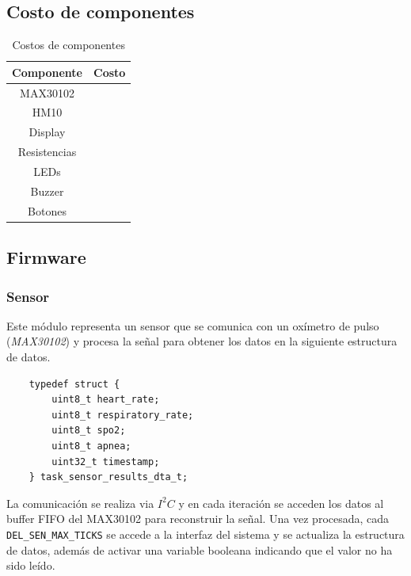 \subsection{Costo de componentes}

\begin{table}[H]
    \centering
    \begin{tabular}{|c|c|} \hline
        Componente & Costo\\ \hline
        MAX30102& \\ \hline
        HM10&  \\ \hline
        Display&  \\ \hline
        Resistencias& \\ \hline
        LEDs& \\ \hline
        Buzzer&  \\ \hline
        Botones&  \\ \hline
    \end{tabular}
    \caption{Costos de componentes}
\end{table}

\subsection{Firmware}
%

\subsubsection{Sensor}\label{sec:sensor} %
Este módulo representa un sensor que se comunica con un oxímetro de pulso (\textit{MAX30102}) y procesa la señal para obtener los datos en la siguiente estructura de datos.%

\begin{verbatim}
    typedef struct {
        uint8_t heart_rate;
        uint8_t respiratory_rate;
        uint8_t spo2;
        uint8_t apnea;
        uint32_t timestamp;
    } task_sensor_results_dta_t;
\end{verbatim}

La comunicación se realiza via $I^2C$ y en cada iteración se acceden los datos al buffer FIFO del MAX30102 para reconstruir la señal.
Una vez procesada, cada \texttt{DEL\_SEN\_MAX\_TICKS} se accede a la interfaz del sistema y se actualiza la estructura de datos, además de activar una variable booleana indicando que el valor no ha sido leído.

